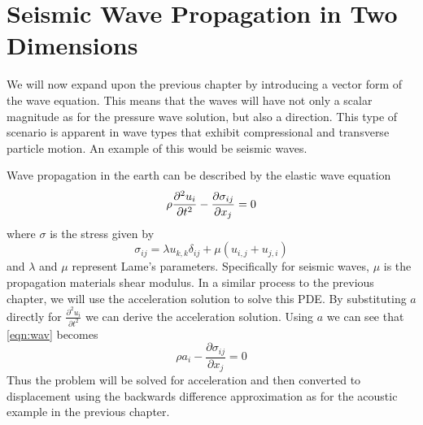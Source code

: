 
%
%
%

\section{Seismic Wave Propagation in Two Dimensions}

We will now expand upon the previous chapter by introducing a vector form of
the wave equation. This means that the waves will have not only a scalar
magnitude as for the pressure wave solution, but also a direction. This type of
scenario is apparent in wave types that exhibit compressional and transverse
particle motion. An example of this would be seismic waves.

Wave propagation in the earth can be described by the elastic wave equation
\begin{equation} \label{eqn:wav} \index{wave equation}
\rho \frac{\partial^{2}u_{i}}{\partial t^2} - \frac{\partial
\sigma_{ij}}{\partial x_{j}} = 0
\end{equation}
where $\sigma$ is the stress given by
\begin{equation} \label{eqn:sigw}
 \sigma _{ij} = \lambda u_{k,k} \delta_{ij} + \mu (
u_{i,j} + u_{j,i})
\end{equation}
and $\lambda$ and $\mu$ represent Lame's parameters. Specifically for seismic
waves, $\mu$ is the propagation materials shear modulus. 
In a similar process to the previous chapter, we will use the acceleration
solution to solve this PDE. By substituting $a$ directly for
$\frac{\partial^{2}u_{i}}{\partial t^2}$ we can derive the
acceleration solution. Using $a$ we can see that \autoref{eqn:wav} becomes
\begin{equation} \label{eqn:wava} 
\rho a_{i} - \frac{\partial
\sigma_{ij}}{\partial x_{j}} = 0
\end{equation}
Thus the problem will be solved for acceleration and then converted to 
displacement using the backwards difference approximation as for the acoustic
example in the previous chapter.


